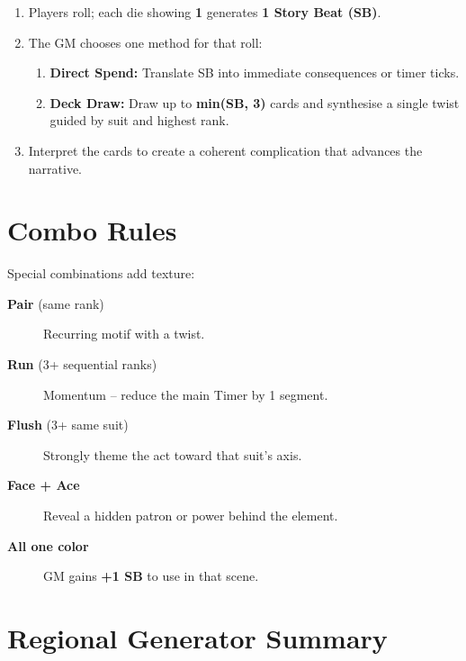 \begin{enumerate}
    \item Players roll; each die showing \textbf{1} generates \textbf{1 Story Beat (SB)}. 
    \item The GM chooses one method for that roll:
        \begin{enumerate}
            \item \textbf{Direct Spend:} Translate SB into immediate consequences or timer ticks.
            \item \textbf{Deck Draw:} Draw up to \textbf{min(SB, 3)} cards and synthesise a single twist guided by suit and highest rank.
        \end{enumerate}
    \item Interpret the cards to create a coherent complication that advances the narrative.
\end{enumerate}

\section{Combo Rules}\label{sec:combo_rules}
Special combinations add texture:

\begin{description}
    \item[\textbf{Pair} (same rank)] Recurring motif with a twist. 
    \item[\textbf{Run} (3+ sequential ranks)] Momentum -- reduce the main Timer by 1 segment. 
    \item[\textbf{Flush} (3+ same suit)] Strongly theme the act toward that suit's axis. 
    \item[\textbf{Face + Ace}] Reveal a hidden patron or power behind the element. 
    \item[\textbf{All one color}] GM gains \textbf{+1 SB} to use in that scene. 
\end{description}

\section{Regional Generator Summary}\label{sec:regional_summary}

